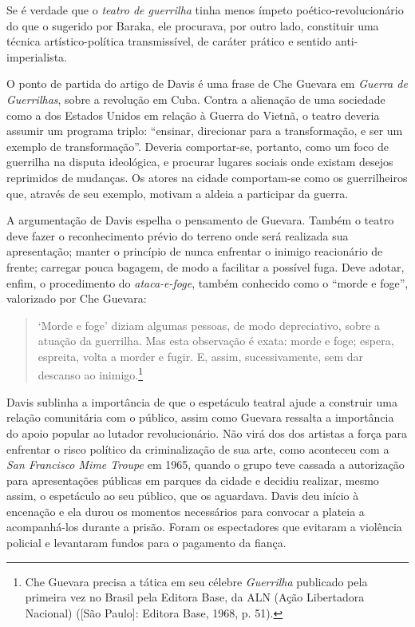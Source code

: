 Se é verdade que o \textit{teatro de guerrilha} tinha menos ímpeto
poético-revolucionário do que o sugerido por Baraka, ele procurava, por
outro lado, constituir uma técnica artístico-política transmissível, de
caráter prático e sentido anti-imperialista.

O ponto de partida do artigo de Davis é uma frase de Che Guevara em
\textit{Guerra de Guerrilhas}, sobre a revolução em Cuba. Contra a
alienação de uma sociedade como a dos Estados Unidos em relação à Guerra
do Vietnã, o teatro deveria assumir um programa triplo: “ensinar,
direcionar para a transformação, e ser um exemplo de transformação”.
Deveria comportar-se, portanto, como um foco de guerrilha na disputa
ideológica, e procurar lugares sociais onde existam desejos reprimidos
de mudanças. Os atores na cidade comportam-se como os guerrilheiros que,
através de seu exemplo, motivam a aldeia a participar da guerra.

A argumentação de Davis espelha o pensamento de Guevara. Também o teatro
deve fazer o reconhecimento prévio do terreno onde será realizada sua
apresentação; manter o princípio de nunca enfrentar o inimigo
reacionário de frente; carregar pouca bagagem, de modo a facilitar a
possível fuga. Deve adotar, enfim, o procedimento do \textit{ataca-e-foge},
também conhecido como o “morde e foge”, valorizado por Che Guevara:

\begin{quote}
‘Morde e foge' diziam algumas pessoas, de modo depreciativo, sobre a
atuação da guerrilha. Mas esta observação é exata: morde e foge; espera,
espreita, volta a morder e fugir. E, assim, sucessivamente, sem dar
descanso ao inimigo.\footnote{Che Guevara precisa a tática em seu
  célebre \textit{Guerrilha} publicado pela primeira vez no Brasil pela
  Editora Base, da ALN (Ação Libertadora Nacional) ({[}São Paulo{]}:
  Editora Base, 1968, p. 51).}
\end{quote}

Davis sublinha a importância de que o espetáculo teatral ajude a
construir uma relação comunitária com o público, assim como Guevara
ressalta a importância do apoio popular ao lutador revolucionário. Não
virá dos dos artistas a força para enfrentar o risco político da
criminalização de sua arte, como aconteceu com a \textit{San Francisco Mime
Troupe} em 1965, quando o grupo teve cassada a autorização para
apresentações públicas em parques da cidade e decidiu realizar, mesmo
assim, o espetáculo ao seu público, que os aguardava. Davis deu início à
encenação e ela durou os momentos necessários para convocar a plateia a
acompanhá-los durante a prisão. Foram os espectadores que evitaram a
violência policial e levantaram fundos para o pagamento da fiança.

